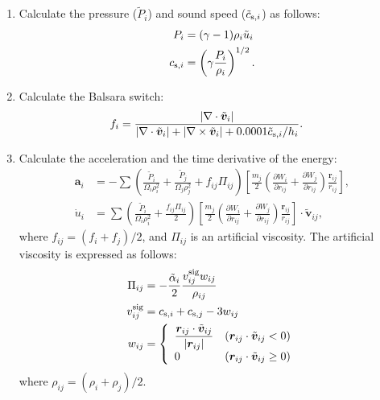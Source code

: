 \documentclass[fleqn,dvipdfmx]{article}
\begin{document}
\begin{enumerate}
\item Calculate the pressure ($\tilde{P}_i$) and sound speed
  ($\tilde{c}_{{\rm s},i}$) as follows:
  \begin{align}
    P_i &= (\gamma - 1) \rho_i \tilde{u}_i \\
    c_{{\rm s},i} &= \left( \gamma \frac{P_i}{\rho_i} \right)^{1/2}.
  \end{align}

\item Calculate the Balsara switch:
  \begin{align}
    f_i &= \frac{|\nabla \cdot \tilde{\bm{v}}_i|}{|\nabla \cdot
      \tilde{\bm{v}}_i| + |\nabla \times \tilde{\bm{v}}_i| + 0.0001
      \tilde{c}_{{\rm s},i} / h_i}.
  \end{align}

\item Calculate the acceleration and the time derivative of the
  energy:
  \begin{align}
    \bm{a}_i &= - \sum \left( \frac{\tilde{P}_i}{\Omega_i \rho_i^2} +
    \frac{\tilde{P}_j}{\Omega_j \rho_j^2} + f_{ij} \Pi_{ij} \right)
    \left[ \frac{m_j}{2} \left( \frac{\partial W_i}{\partial r_{ij}} +
      \frac{\partial W_j}{\partial r_{ij}} \right)
      \frac{\bm{r}_{ij}}{r_{ij}} \right], \\ \dot{u}_i &= \sum \left(
    \frac{\tilde{P}_i}{\Omega_i \rho_i^2} + \frac{f_{ij} \Pi_{ij}}{2}
    \right) \left[ \frac{m_j}{2} \left( \frac{\partial W_i}{\partial
        r_{ij}} + \frac{\partial W_j}{\partial r_{ij}} \right)
      \frac{\bm{r}_{ij}}{r_{ij}} \right] \cdot \tilde{\bm{v}}_{ij},
  \end{align}
  where $f_{ij}=(f_i+f_j)/2$, and $\Pi_{ij}$ is an artificial
  viscosity. The artificial viscosity is expressed as follows:
  \begin{align}
    \Pi_{ij} &= - \frac{\tilde{\alpha}_i}{2} \frac{v_{ij}^{\rm sig}
      w_{ij}}{\rho_{ij}} \\
    v_{ij}^{\rm sig} &= c_{{\rm s},i} + c_{{\rm s},j} - 3 w_{ij} \\
    w_{ij} &= \left\{
    \begin{array}{ll}
      \displaystyle \frac{\bm{r}_{ij} \cdot
        \tilde{\bm{v}}_{ij}}{|\bm{r}_{ij}|} & (\bm{r}_{ij} \cdot
     \tilde{\bm{v}}_{ij} < 0) \\ 0 & (\bm{r}_{ij} \cdot
      \tilde{\bm{v}}_{ij} \ge 0)
    \end{array}
    \right.    
  \end{align}
  where $\rho_{ij}=(\rho_i+\rho_j)/2$.


\end{enumerate}
\end{document}
